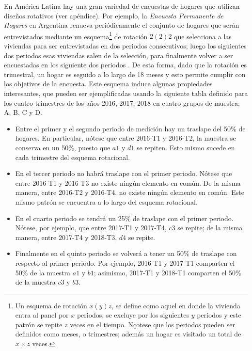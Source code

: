 \documentclass[
  12pt,
]{book}
\providecommand{\tightlist}{%
  \setlength{\itemsep}{0pt}\setlength{\parskip}{0pt}}
\begin{document}
En América Latina hay una gran variedad de encuestas de hogares que utilizan diseños rotativos (ver apéndice). Por ejemplo, la \emph{Encuesta Permanente de Hogares} en Argentina renueva periódicamente el conjunto de hogares que serán entrevistados mediante un esquema\footnote{Un esquema de rotación \(x(y)z\), se define como aquel en donde la vivienda entra al panel por \(x\) periodos, se excluye por los siguientes \(y\) periodos y este patrón se repite \(z\) veces en el tiempo. Nçotese que los periodos pueden ser definidos como meses, o trimestres; además un hogar es visitado un total de \(x \times z\) veces.} de rotación \(2(2)2\) que selecciona a las viviendas para ser entrevistadas en dos periodos consecutivos; luego los siguientes dos periodos esas viviendas salen de la selección, para finalmente volver a ser encuestadas en los siguiente dos periodos \citep{INDEC-AR}. De esta forma, dado que la rotación es trimestral, un hogar es seguido a lo largo de 18 meses y esto permite cumplir con los objetivos de la encuesta. Este esquema induce algunas propiedades interesantes, que pueden ser ejemplificadas usando la siguiente tabla definido para los cuatro trimestres de los años 2016, 2017, 2018 en cuatro grupos de muestra: A, B, C y D.

\begin{itemize}
\tightlist
\item
  Entre el primer y el segundo periodo de medición hay un traslape del 50\% de hogares. En particular, nótese que entre 2016-T1 y 2016-T2, la muestra se conserva en un 50\%, puesto que \(a1\) y \(d1\) se repiten. Esto mismo sucede en cada trimestre del esquema rotacional.
\item
  En el tercer periodo no habrá traslape con el primer periodo. Nótese que entre 2016-T1 y 2016-T3 no existe ningún elemento en común. De la misma manera, entre 2016-T2 y 2016-T4, no existe ningún elemento en común. Este mismo patrón se encuentra a lo largo del esquema rotacional.
\item
  En el cuarto periodo se tendrá un 25\% de traslape con el primer periodo. Nótese, por ejemplo, que entre 2017-T1 y 2017-T4, \(c3\) se repite; de la misma manera, entre 2017-T4 y 2018-T3, \(d4\) se repite.
\item
  Finalmente en el quinto periodo se volverá a tener un 50\% de traslape con respecto al primer periodo. Por ejemplo, 2016-T1 y 2017-T1 comparten el 50\% de la muestra \(a1\) y \(b1\); asimismo, 2017-T1 y 2018-T1 comparten el 50\% de la muestra \(c3\) y \(b3\).
\end{itemize}
\end{document}
